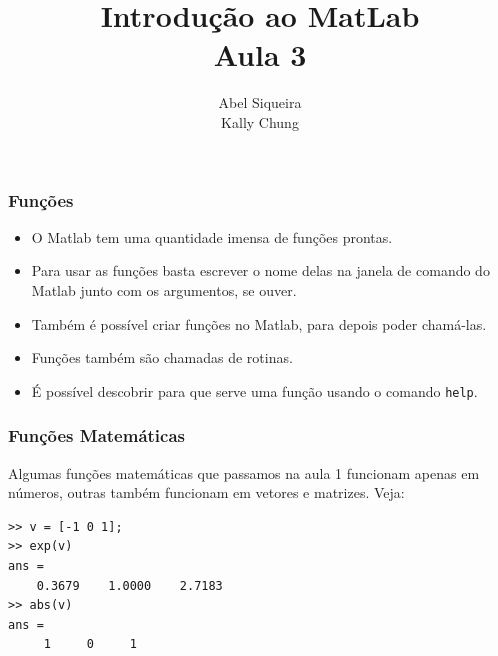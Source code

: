 \documentclass{beamer}
\title{Introdu\c{c}\~ao ao MatLab \\ Aula 3}
\author{Abel Siqueira \\ Kally Chung}
\date{}
\begin{document}
\frame{\titlepage}

\section[Fun\c{c}\~oes]{}
\begin{frame}[fragile]

  \frametitle{Fun\c{c}\~oes}

  \begin{itemize}
  \item<1-> O Matlab tem uma quantidade imensa de fun\c{c}\~oes prontas.
  \item<2-> Para usar as fun\c{c}\~oes basta escrever o nome delas na janela de comando do Matlab junto com os argumentos, se ouver.
  \item<3-> Tamb\'em \'e poss\'ivel criar fun\c{c}\~oes no Matlab, para depois poder cham\'a-las.
  \item<4-> Fun\c{c}\~oes tamb\'em s\~ao chamadas de rotinas.
  \item<5-> \'E poss\'ivel descobrir para que serve uma fun\c{c}\~ao usando o comando {\tt help}.
  \end{itemize}

\end{frame}

\begin{frame}[fragile]
\frametitle{Fun\c{c}\~oes Matem\'aticas}
Algumas fun\c{c}\~oes matem\'aticas que passamos na aula 1 funcionam apenas em n\'umeros, outras tamb\'em funcionam em vetores e matrizes. Veja:
{\scriptsize
\begin{verbatim}
>> v = [-1 0 1];
>> exp(v)
ans =
    0.3679    1.0000    2.7183
>> abs(v)
ans =
     1     0     1
\end{verbatim}
}

\end{frame}

\subsection[Arquivos m]{}
\end{document}

